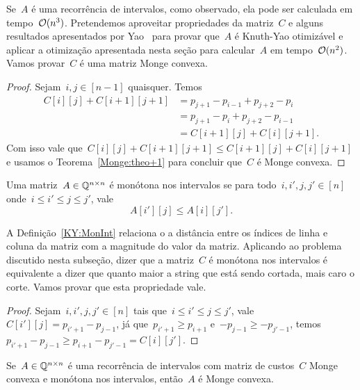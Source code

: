 Se~$A$ é uma recorrência de intervalos, como observado, ela pode ser calculada em tempo~$\mathcal{O}(n^3)$. Pretendemos aproveitar propriedades da matriz~$C$ e alguns resultados apresentados por Yao~\cite{Yao:1980} para provar que~$A$ é Knuth-Yao otimizável e aplicar a otimização apresentada nesta seção para calcular~$A$ em tempo~$\mathcal{O}(n^2)$. Vamos provar~$C$ é uma matriz Monge convexa.

\begin{proof}
Sejam~$i,j \in [n-1]$ quaisquer. Temos 
\begin{align*}
    C[i][j] + C[i+1][j+1] &= p_{j+1} - p_{i-1} + p_{j+2} - p_{i} \\
                          &= p_{j+1} - p_{i} + p_{j+2} - p_{i-1} \\
                          &= C[i+1][j] + C[i][j+1] \text{.}
\end{align*}
Com isso vale que~$C[i][j] + C[i+1][j+1] \leq C[i+1][j] + C[i][j+1]$ e usamos o Teorema~\ref{Monge:theo+1} para concluir que~$C$ é Monge convexa.
\end{proof}

\begin{defi} \label{KY:MonInt}
Uma matriz~$A \in \mathbb{Q}^{n \times n}$ é monótona nos intervalos se para todo~$i,i',j,j' \in [n]$ onde~$i \leq i' \leq j \leq j'$, vale
$$A[i'][j] \leq A[i][j'] \text{.}$$
\end{defi}

A Definição~\ref{KY:MonInt} relaciona o a distância entre os índices de linha e coluna da matriz com a magnitude do valor da matriz. Aplicando ao problema discutido nesta subseção, dizer que a matriz~$C$ é monótona nos intervalos é equivalente a dizer que quanto maior a string que está sendo cortada, mais caro o corte. Vamos provar que esta propriedade vale.

\begin{proof}
Sejam~$i,i',j,j' \in [n]$ tais que~$i \leq i' \leq j \leq j'$, vale~$C[i'][j] = p_{i'+1} - p_{j-1}$, já que~${p_{i'+1} \geq p_{i+1}}$ e~${-p_{j-1} \geq -p_{j'-1}}$, temos~$p_{i'+1} - p_{j-1} \geq p_{i+1} - p_{j'-1} = C[i][j']$.
\end{proof}

\begin{lema} \label{KY:CtoA}
Se~$A \in \mathbb{Q}^{n \times n}$ é uma recorrência de intervalos com matriz de custos~$C$ Monge convexa e monótona nos intervalos, então~$A$ é Monge convexa.
\end{lema}

